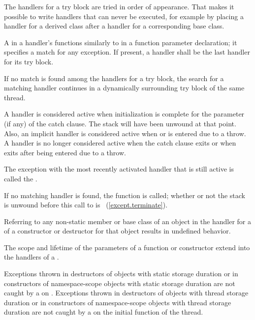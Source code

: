 \pnum
The handlers for a try block are tried in order of appearance.
That makes it possible to write handlers that can never be
executed, for example by placing a handler for a derived class after
a handler for a corresponding base class.

\pnum
A
in a handler's
functions similarly to
in a function parameter declaration;
it specifies a match for any exception.
If present, a
handler shall be the last handler for its try block.

\pnum
If no match is found among the handlers for a try block,
the search for a matching
handler continues in a dynamically surrounding try block
of the same thread.

\pnum
A handler is considered active when initialization is complete for
the parameter (if any) of the catch clause.
\enternote
The stack will have been unwound at that point.
\exitnote
Also, an implicit handler is considered active when
or
is entered due to a throw. A handler is no longer considered active when the
catch clause exits or when
exits after being entered due to a throw.

\pnum
The exception with the most recently activated handler that is
still active is called the
.

\pnum
If no matching handler is found,
the function
is called;
whether or not the stack is unwound before this call to
is ~(\ref{except.terminate}).

\pnum
Referring to any non-static member or base class of an object
in the handler for a
of a constructor or destructor for that object results in undefined behavior.

\pnum
The scope and lifetime of the parameters of a function or constructor
extend into the handlers of a
.

\pnum
Exceptions thrown in destructors of objects with static storage duration or in
constructors of namespace-scope objects with static storage duration are not caught by a
on
. Exceptions thrown in destructors of objects with thread storage duration or in constructors of namespace-scope objects with thread storage duration are not caught by a
on the initial function of the thread.


